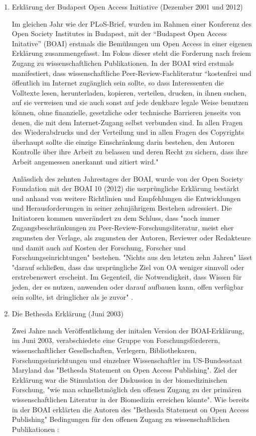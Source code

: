 \begin{enumerate}
\item Erklärung der Budapest Open Access Initiative (Dezember 2001 und 2012)

Im gleichen Jahr wie der PLoS-Brief, wurden im Rahmen einer Konferenz des Open Society Institutes in Budapest, mit der “Budapest Open Access Initative” (BOAI)\cite{boai_2012} erstmals die Bemühungen um Open Access in einer eigenen Erklärung zusammengefasst\cite{cite:21a}. Im Fokus dieser steht die Forderung nach freiem Zugang zu wissenschaftlichen Publikationen. In der BOAI wird erstmals manifestiert, dass wissenschaftliche Peer-Review-Fachliteratur “kostenfrei und öffentlich im Internet zugänglich sein sollte, so dass Interessenten die Volltexte lesen, herunterladen, kopieren, verteilen, drucken, in ihnen suchen, auf sie verweisen und sie auch sonst auf jede denkbare legale Weise benutzen können, ohne finanzielle, gesetzliche oder technische Barrieren jenseits von denen, die mit dem Internet-Zugang selbst verbunden sind. In allen Fragen des Wiederabdrucks und der Verteilung und in allen Fragen des Copyrights überhaupt sollte die einzige Einschränkung darin bestehen, den Autoren Kontrolle über ihre Arbeit zu belassen und deren Recht zu sichern, dass ihre Arbeit angemessen anerkannt und zitiert wird."\cite{boai_2012}

Anlässlich des zehnten Jahrestages der BOAI, wurde von der Open Society Foundation mit der BOAI 10 (2012) die usrprüngliche Erklärung bestärkt und anhand von weitere Richtlinien und Empfehlungen die Entwicklungen und Herausforderungen in seiner zehnjährigem Bestehen adressiert. Die Initiatoren kommen unverändert zu dem Schluss, dass "noch immer Zugangsbeschränkungen zu Peer-Review-Forschungsliteratur, meist eher zugunsten der Verlage, als zugunsten der Autoren, Reviewer oder Redakteure und damit auch auf Kosten der Forschung, Forscher und Forschungseinrichtungen" \cite{boai_2012} bestehen. "Nichts aus den letzten zehn Jahren" lässt "darauf schließen, dass das ursprüngliche Ziel von OA weniger sinnvoll oder erstrebenswert erscheint. Im Gegenteil, die Notwendigkeit, dass Wissen für jeden, der es nutzen, anwenden oder darauf aufbauen kann, offen verfügbar sein sollte, ist dringlicher als je zuvor" \cite{boai_2012}.

\item Die Bethesda Erklärung (Juni 2003)

Zwei Jahre nach Veröffentlichung der initalen Version der BOAI-Erklärung, im Juni 2003, verabschiedete eine Gruppe von Forschungsförderern, wissenschaftlicher Gesellschaften, Verlegern, Bibliothekaren, Forschungseinrichtungen und einzelner Wissenschaftler im US-Bundesstaat Maryland das "Bethesda Statement on Open Access Publishing".\cite{suchen} Ziel der Erklärung war die Stimulation der Diskussion in der biomedizinischen Forschung, "wie man schnellstmöglich den offenen Zugang zu der primären wissenschaftlichen Literatur in der Biomedizin erreichen könnte"\cite{suchen}. Wie bereits in der BOAI erklärten die Autoren des "Bethesda Statement on Open Access Publishing" Bedingungen für den offenen Zugang zu wissenschaftlichen Publikationen \cite{suchen}:


\end{enumerate}
